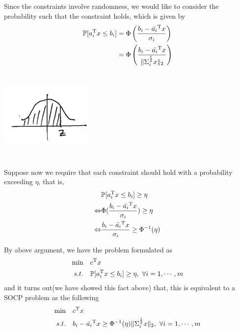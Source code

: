 Since the constraints involve randomness, we would like to consider the probability such that the constraint holds, which is given by
\begin{align*}
\mathbb{P}[a^{{\rm T}}_i x\leq b_i]
&= \Phi\left(\frac{b_i - \bar{a_i}^{{\rm T}}x}{\sigma_i}\right)\\
&= \Phi\left(\frac{b_i - \bar{a_i}^{{\rm T}}x}{\Vert \Sigma_i^{\frac{1}{2}} x\Vert_2}\right)
\end{align*}

\begin{marginfigure}
\centering
\includegraphics[width=1.8in,height=1.8in]{figures/ch09/figure1118_2.png}
\end{marginfigure}

Suppose now we require that each constraint should hold with a probability exceeding $\eta$, that is,
\begin{align*}
& \mathbb{P}[a_i^{{\rm T}}x\leq b_i]\geq \eta\\
\Leftrightarrow&\Phi(\frac{b_i - \bar{a_i}^{{\rm T}}x}{\sigma_i})\geq \eta\\
\Leftrightarrow&\frac{b_i - \bar{a_i}^{{\rm T}}x}{\sigma_i}\geq \Phi^{-1}(\eta)
\end{align*}

By above argument, we have the problem formulated as 
\begin{align*}
\min \quad& c^{{\rm T}}x \\
s.t. \quad& \mathbb{P}[a_i^{{\rm T}}x\leq b_i]\geq \eta,\ \forall i = 1,\cdots,m
\end{align*}
and it turns out(we have showed this fact above) that, this is equivalent to a SOCP problem as the following
\begin{align*}
\min \quad& c^{{\rm T}}x \\
s.t. \quad& b_i - \bar{a_i}^{{\rm T}}x\geq \Phi^{-1}(\eta)\Vert\Sigma_i^{\frac{1}{2}}x\Vert_2,\ \forall i = 1,\cdots,m
\end{align*}




